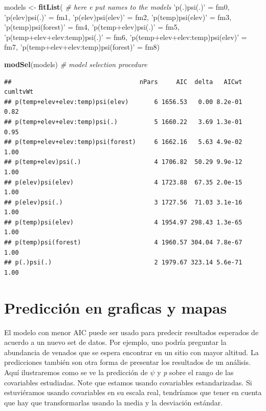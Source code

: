 \documentclass[]{book}
\newenvironment{Shaded}{\begin{snugshade}}{\end{snugshade}}
\newcommand{\KeywordTok}[1]{\textcolor[rgb]{0.13,0.29,0.53}{\textbf{{#1}}}}
\newcommand{\StringTok}[1]{\textcolor[rgb]{0.31,0.60,0.02}{{#1}}}
\newcommand{\CommentTok}[1]{\textcolor[rgb]{0.56,0.35,0.01}{\textit{{#1}}}}
\newcommand{\NormalTok}[1]{{#1}}
\begin{document}
\begin{Shaded}
\begin{Highlighting}[]
\NormalTok{models <-}\StringTok{ }\KeywordTok{fitList}\NormalTok{( }\CommentTok{# here e put names to the models}
  \StringTok{'p(.)psi(.)'}                        \NormalTok{=}\StringTok{ }\NormalTok{fm0,}
  \StringTok{'p(elev)psi(.)'}                     \NormalTok{=}\StringTok{ }\NormalTok{fm1,}
  \StringTok{'p(elev)psi(elev)'}                  \NormalTok{=}\StringTok{ }\NormalTok{fm2,}
  \StringTok{'p(temp)psi(elev)'}                  \NormalTok{=}\StringTok{ }\NormalTok{fm3,}
  \StringTok{'p(temp)psi(forest)'}                \NormalTok{=}\StringTok{ }\NormalTok{fm4,}
  \StringTok{'p(temp+elev)psi(.)'}                \NormalTok{=}\StringTok{ }\NormalTok{fm5,}
  \StringTok{'p(temp+elev+elev:temp)psi(.)'}      \NormalTok{=}\StringTok{ }\NormalTok{fm6,}
  \StringTok{'p(temp+elev+elev:temp)psi(elev)'}   \NormalTok{=}\StringTok{ }\NormalTok{fm7,}
  \StringTok{'p(temp+elev+elev:temp)psi(forest)'} \NormalTok{=}\StringTok{ }\NormalTok{fm8)}

\KeywordTok{modSel}\NormalTok{(models) }\CommentTok{# model selection procedure}
\end{Highlighting}
\end{Shaded}

\begin{verbatim}
##                                   nPars     AIC  delta   AICwt cumltvWt
## p(temp+elev+elev:temp)psi(elev)       6 1656.53   0.00 8.2e-01     0.82
## p(temp+elev+elev:temp)psi(.)          5 1660.22   3.69 1.3e-01     0.95
## p(temp+elev+elev:temp)psi(forest)     6 1662.16   5.63 4.9e-02     1.00
## p(temp+elev)psi(.)                    4 1706.82  50.29 9.9e-12     1.00
## p(elev)psi(elev)                      4 1723.88  67.35 2.0e-15     1.00
## p(elev)psi(.)                         3 1727.56  71.03 3.1e-16     1.00
## p(temp)psi(elev)                      4 1954.97 298.43 1.3e-65     1.00
## p(temp)psi(forest)                    4 1960.57 304.04 7.8e-67     1.00
## p(.)psi(.)                            2 1979.67 323.14 5.6e-71     1.00
\end{verbatim}

\section{Predicción en graficas y
mapas}\label{prediccion-en-graficas-y-mapas}

El modelo con menor AIC puede ser usado para predecir resultados
esperados de acuerdo a un nuevo set de datos. Por ejemplo, uno podría
preguntar la abundancia de venados que se espera encontrar en un sitio
con mayor altitud. La predicciones también son otra forma de presentar
los resultados de un análisis. Aquí ilustraremos como se ve la
predicción de \(\psi\) y \emph{p} sobre el rango de las covariables
estudiadas. Note que estamos usando covariables estandarizadas. Si
estuviéramos usando covariables en su escala real, tendríamos que tener
en cuenta que hay que transformarlas usando la media y la desviación
estándar.
\end{document}
